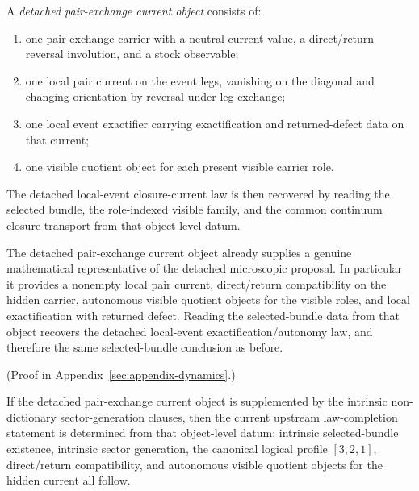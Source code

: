 \begin{definition}
\label{def:detached-pair-exchange-current-object}
A \emph{detached pair-exchange current object} consists of:
\begin{enumerate}[label=(\roman*), leftmargin=2em, itemsep=0.2em]
\item one pair-exchange carrier with a neutral current value, a direct/return
      reversal involution, and a stock observable;
\item one local pair current on the event legs, vanishing on the diagonal and
      changing orientation by reversal under leg exchange;
\item one local event exactifier carrying exactification and returned-defect
      data on that current;
\item one visible quotient object for each present visible carrier role.
\end{enumerate}
The detached local-event closure-current law is then recovered by reading the
selected bundle, the role-indexed visible family, and the common continuum
closure transport from that object-level datum.
\end{definition}

\begin{theorem}
\label{thm:detached-pair-exchange-current-object-recovers-local-event-law}
The detached pair-exchange current object already supplies a genuine
mathematical representative of the detached microscopic proposal. In
particular it
provides a nonempty local pair current, direct/return compatibility on the
hidden carrier, autonomous visible quotient objects for the visible roles, and
local exactification with returned defect. Reading the selected-bundle data
from that object recovers the detached local-event exactification/autonomy law,
and therefore the same selected-bundle conclusion as before.
\end{theorem}

(Proof in Appendix~\ref{sec:appendix-dynamics}.)

\begin{corollary}
\label{cor:detached-pair-exchange-current-object-closes-current-forcing-seam}
If the detached pair-exchange current object is supplemented by the intrinsic
non-dictionary sector-generation clauses, then the current upstream
law-completion statement is determined from that object-level datum: intrinsic
selected-bundle existence, intrinsic sector generation, the canonical logical
profile \([3,2,1]\), direct/return compatibility, and autonomous visible
quotient objects for the hidden current all follow.
\end{corollary}


